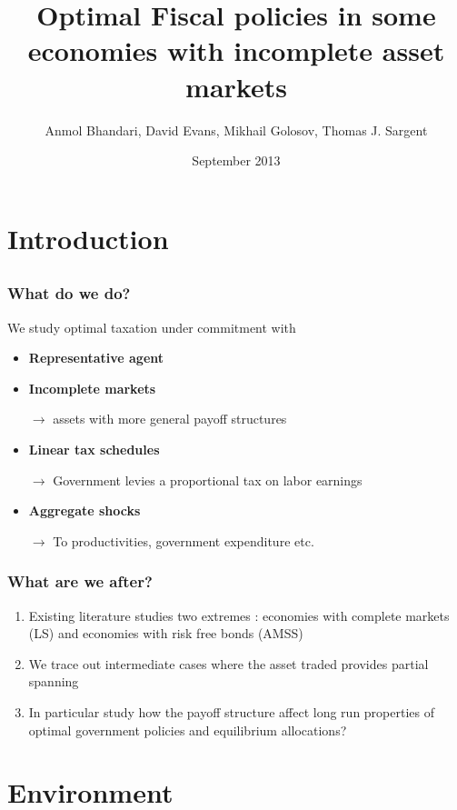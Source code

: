 \documentclass{beamer}
\title { Optimal Fiscal
policies in some economies with incomplete asset markets}
\author{Anmol Bhandari, David Evans, Mikhail Golosov, Thomas J. Sargent}
\date{September 2013}
\begin{document}
%
\begin{frame}
\titlepage

\end{frame}
\section{Introduction}
\subsection{}
\begin{frame}
\frametitle{What do we do?}
We study optimal taxation under commitment with
\begin{itemize}
 \item \textbf{Representative agent}

 \item \textbf{Incomplete markets}

 \quad \color{red}$\rightarrow$ \color{black} assets with more general payoff structures

 \item \textbf{Linear tax schedules}

 \quad \color{red}$\rightarrow$ \color{black}Government levies a proportional tax on labor earnings 

 \item \textbf{Aggregate shocks}

 \quad \color{red}$\rightarrow$ \color{black} To productivities, government expenditure etc.

 \end{itemize}
\end{frame}


\begin{frame}
\frametitle{What are we after?}

\begin{enumerate}
\item Existing literature studies two extremes : economies with complete markets (LS) and economies with risk free bonds (AMSS)
\item We trace out intermediate cases where the asset traded provides partial spanning
 \item In particular study how the payoff structure affect long run properties of optimal government policies and equilibrium allocations?
\end{enumerate}

\end{frame}


\section{Environment}
\end{document}

